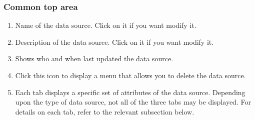 \documentclass[letterpaper,10pt,english]{sphinxmanual}
\begin{document}
\subsubsection{Common top area}
\label{\detokenize{discovery/part02/data_source_detail_view:id2}}\begin{enumerate}
\def\theenumi{\arabic{enumi}}
\def\labelenumi{\theenumi .}
\makeatletter\def\p@enumii{\p@enumi \theenumi .}\makeatother
\item {} 
 Name of the data source. Click on it if you want modify it.

\item {} 
 Description of the data source. Click on it if you want modify it.

\item {} 
 Shows who and when last updated the data source.

\item {} 
 Click this icon to display a menu that allows you to delete the data source.

\item {} 
 Each tab displays a specific set of attributes of the data source. Depending upon the type of data source, not all of the three tabs may be displayed. For details on each tab, refer to the relevant subsection below.

\end{enumerate}
\end{document}
